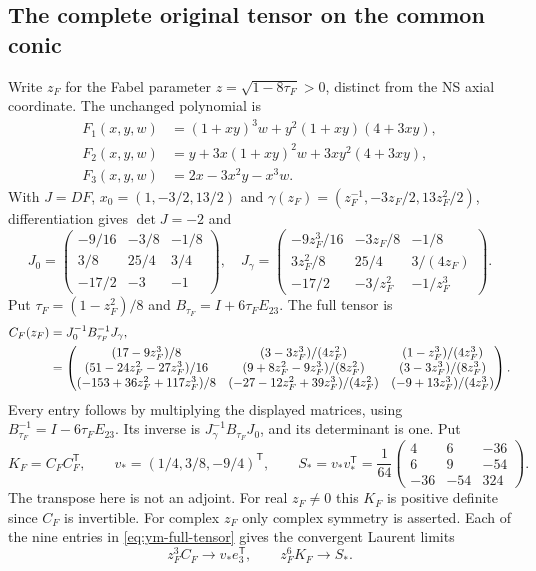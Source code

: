 \subsection{The complete original tensor on the common conic}

Write $z_F$ for the Fabel parameter
$z=\sqrt{1-8\tau_F}>0$, distinct from the NS axial coordinate.
The unchanged polynomial is
\begin{align*}
 F_1(x,y,w)&=(1+xy)^3w+y^2(1+xy)(4+3xy),\\
 F_2(x,y,w)&=y+3x(1+xy)^2w+3xy^2(4+3xy),\\
 F_3(x,y,w)&=2x-3x^2y-x^3w .
\end{align*}
With $J=DF$, $x_0=(1,-3/2,13/2)$ and
$\gamma(z_F)=(z_F^{-1},-3z_F/2,13z_F^2/2)$, differentiation gives
$\det J=-2$ and
\[
 J_0=\begin{pmatrix}-9/16&-3/8&-1/8\\3/8&25/4&3/4\\-17/2&-3&-1\end{pmatrix},
 \quad J_\gamma=\begin{pmatrix}
 -9z_F^3/16&-3z_F/8&-1/8\\3z_F^2/8&25/4&3/(4z_F)\\
 -17/2&-3/z_F^2&-1/z_F^3
 \end{pmatrix}.
\]
Put $\tau_F=(1-z_F^2)/8$ and $B_{\tau_F}=I+6\tau_FE_{23}$.
The full tensor is
\begin{align}
 C_F(z_F)&=J_0^{-1}B_{\tau_F}^{-1}J_\gamma,\notag\\
 &=\begin{pmatrix}
 (17-9z_F^3)/8&(3-3z_F^3)/(4z_F^2)&(1-z_F^3)/(4z_F^3)\\
 (51-24z_F^2-27z_F^3)/16&(9+8z_F^2-9z_F^3)/(8z_F^2)&(3-3z_F^3)/(8z_F^3)\\
 (-153+36z_F^2+117z_F^3)/8&(-27-12z_F^2+39z_F^3)/(4z_F^2)&(-9+13z_F^3)/(4z_F^3)
 \end{pmatrix}.\label{eq:ym-full-tensor}
\end{align}
Every entry follows by multiplying the displayed matrices, using
$B_{\tau_F}^{-1}=I-6\tau_FE_{23}$. Its inverse is
$J_\gamma^{-1}B_{\tau_F}J_0$, and its determinant is one.
Put
\[
 K_F=C_FC_F^{\mathsf T},\qquad
 v_*=(1/4,3/8,-9/4)^{\mathsf T},\qquad
 S_*=v_*v_*^{\mathsf T}
 =\frac1{64}\begin{pmatrix}4&6&-36\\6&9&-54\\-36&-54&324\end{pmatrix}.
\]
The transpose here is not an adjoint. For real $z_F\ne0$ this
$K_F$ is positive definite since $C_F$ is invertible. For complex
$z_F$ only complex symmetry is asserted. Each of the nine entries
in \eqref{eq:ym-full-tensor} gives the convergent Laurent limits
\begin{equation}\label{eq:ym-full-endpoint}
 z_F^3C_F\longrightarrow v_*e_3^{\mathsf T},\qquad
 z_F^6K_F\longrightarrow S_* .
\end{equation}

